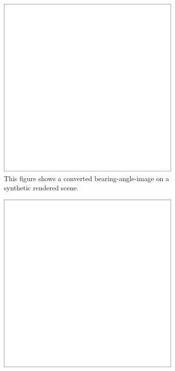 \begin{figure}[H]
    \begin{subfigure}[t]{0.32\textwidth}
        \includegraphics[width=\linewidth]{chapter04/img/max-0001.png}
        \caption{This figure shows a converted \gls{bearing-angle-image} on a synthetic rendered scene.}
    \end{subfigure}
    \begin{subfigure}[t]{0.32\textwidth}
        \includegraphics[width=\linewidth]{chapter04/img/max-0030.png}

\end{subfigure}
\end{figure}
